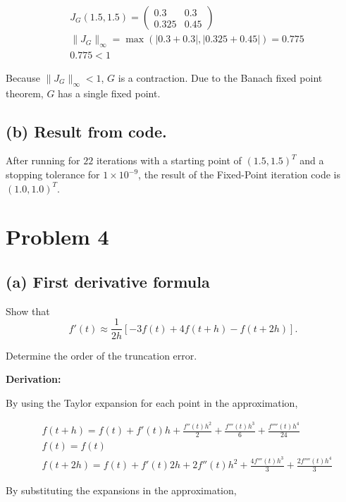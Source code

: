 \documentclass[11pt]{article}
\begin{document}
\[
\begin{aligned}
  &J_G(1.5, 1.5) = 
  \begin{pmatrix}
    0.3 & 0.3 \\
    0.325 & 0.45
  \end{pmatrix} \\
  &\|J_G\|_{\infty} = \max (|0.3 + 0.3|, |0.325 + 0.45|) = 0.775 \\
  & 0.775 < 1
\end{aligned}
\]

\noindent Because $\|J_G\|_{\infty} < 1$, $G$ is a contraction. Due to the 
Banach fixed point theorem, $G$ has a single fixed point.

\subsection*{(b) Result from code.}
After running for $22$ iterations with a starting point of $(1.5, 1.5)^T$ and a stopping tolerance for $1 \times 10^{-9}$, the result of the Fixed-Point iteration code is $(1.0, 1.0)^T$.

\newpage

\section*{Problem 4}

\subsection*{(a) First derivative formula}

Show that
\[
f'(t)\approx
\frac{1}{2h}
\left[
-3f(t)+4f(t+h)-f(t+2h)
\right].
\]

\noindent Determine the order of the truncation error.

\bigskip

\noindent\textbf{Derivation:}

\noindent By using the Taylor expansion for each point in the approximation,

\[
  \begin{aligned}
    &f(t+h) = f(t) + f'(t)h + \frac{f''(t)h^2}{2} + \frac{f'''(t)h^3}{6} + \frac{f''''(t)h^4}{24}\\
    &f(t) = f(t)\\
    &f(t+2h) = f(t) + f'(t)2h + 2f''(t)h^2 + \frac{4f'''(t)h^3}{3} + \frac{2f''''(t)h^4}{3}
  \end{aligned}
\]

\noindent By substituting the expansions in the approximation,
\end{document}
